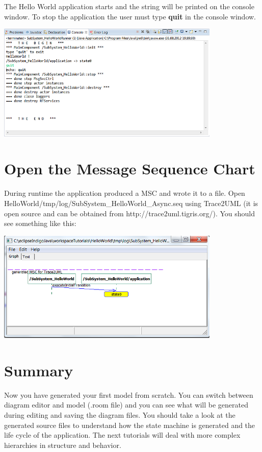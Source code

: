 The Hello World application starts and the string will be printed on the console window. To stop the 
application the user must type \textbf{quit} in the console window.

\includegraphics[width=0.8\textwidth]{images/015-HelloWorld08.png}

\section{Open the Message Sequence Chart}

During runtime the application produced a MSC and wrote it to a file. Open 
HelloWorld/tmp/log/SubSystem\_HelloWorld\_Async.seq using Trace2UML (it is open source and can be obtained 
from  http://trace2uml.tigris.org/). You should see something like this:

\includegraphics[width=0.8\textwidth]{images/015-HelloWorld09.png}


\section{Summary}

Now you have generated your first \eTrice{} model from scratch. You can switch between diagram editor and 
model (.room file) and you can see what will be generated during editing and saving the diagram files. 
You should take a look at the generated source files to understand how the state machine is generated and 
the life cycle of the application. The next tutorials will deal with more complex hierarchies in structure 
and behavior.
